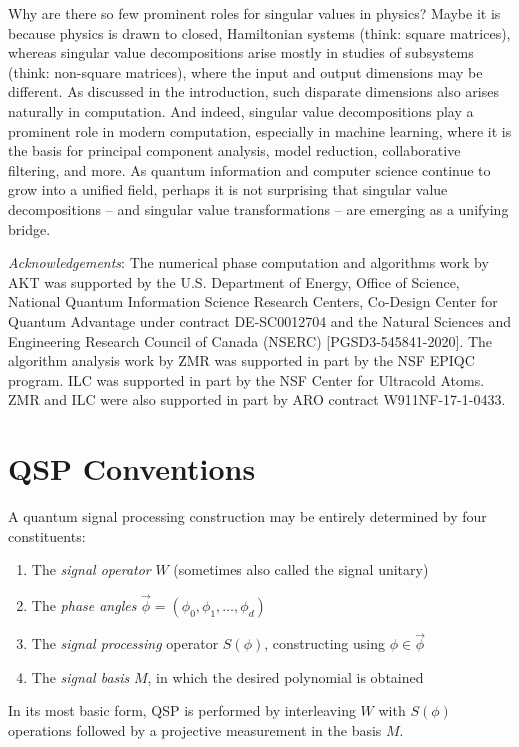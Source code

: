 \documentclass[aps,pra,showpacs,notitlepage,twocolumn,superscriptaddress,nofootinbib]{revtex4-1}
\begin{document}
    Why are there so few prominent roles for singular values in physics?  Maybe it is because physics is drawn to closed, Hamiltonian systems (think: square matrices), whereas singular value decompositions arise mostly in studies of subsystems (think: non-square matrices), where the input and output dimensions may be different.  As discussed in the introduction, such disparate dimensions also arises naturally in computation.  And indeed, singular value decompositions play a prominent role in modern computation, especially in machine learning, where it is the basis for principal component analysis, model reduction, collaborative filtering, and more.  As quantum information and computer science continue to grow into a unified field, perhaps it is not surprising that singular value decompositions -- and singular value transformations -- are emerging as a unifying bridge.
    
    \textit{Acknowledgements}: The numerical phase computation and algorithms work by AKT was supported by the U.S. Department of Energy, Office of Science, National Quantum Information Science Research Centers, Co-Design Center for Quantum Advantage under contract DE-SC0012704 and the Natural Sciences and Engineering Research Council of Canada (NSERC) [PGSD3-545841-2020].  The algorithm analysis work by ZMR was supported in part by the NSF EPIQC program.
    ILC was supported in part by the NSF Center for Ultracold Atoms.  ZMR and ILC were also supported in part by ARO contract W911NF-17-1-0433. 


\appendix
\section{QSP Conventions} \label{sec:QSPConventions}

A quantum signal processing construction may be entirely determined by four constituents:
\begin{enumerate}
\item The {\em signal operator} $W$ (sometimes also called the signal unitary)
\item The {\em phase angles} $\vec{\phi} = (\phi_0, \phi_1, \ldots, \phi_d)$
\item The {\em signal processing} operator $S(\phi)$, constructing using $\phi\in \vec{\phi}$
\item The {\em signal basis} $M$, in which the desired polynomial is obtained
\end{enumerate}
In its most basic form, QSP is performed by interleaving $W$ with $S(\phi)$ operations followed by a projective measurement in the basis $M$. 
\end{document}
